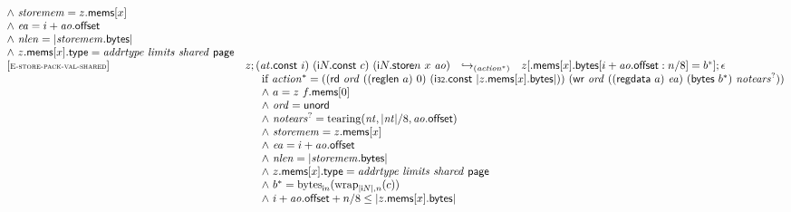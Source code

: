 $$\begin{array}[t]{@{}lrcl@{}l@{}}
{\begin{array}[t]{@{}l@{}}
{\land}~ {\mathit{storemem}} = z{.}\mathsf{mems}{}[x] \\
{\land}~ {\mathit{ea}} = i + {\mathit{ao}}{.}\mathsf{offset} \\
{\land}~ {\mathit{nlen}} = {|{\mathit{storemem}}{.}\mathsf{bytes}|} \\
{\land}~ z{.}\mathsf{mems}{}[x]{.}\mathsf{type} = {\mathit{addrtype}}~{\mathit{limits}}~{\mathit{shared}}~\mathsf{page} \\
\end{array}
} \\
{[\textsc{\scriptsize E{-}store{-}pack{-}val{-}shared}]} \quad & z ; ({\mathit{at}}{.}\mathsf{const}~i)~({\mathsf{i}}{N}{.}\mathsf{const}~c)~({{\mathsf{i}}{N}{.}\mathsf{store}}{n}~x~{\mathit{ao}}) & {\hookrightarrow}_{({{\mathit{action}}^\ast})} {} & z{}[{.}\mathsf{mems}{}[x]{.}\mathsf{bytes}{}[i + {\mathit{ao}}{.}\mathsf{offset} : n / 8] = {b^\ast}] ; \epsilon &  \\
& \multicolumn{4}{@{}l@{}}{\quad
\quad
\begin{array}[t]{@{}l@{}}
\mbox{if}~ {{\mathit{action}}^\ast} = ((\mathsf{rd}~{\mathit{ord}}~((\mathsf{reglen}~a)~0)~(\mathsf{i{\scriptstyle 32}}{.}\mathsf{const}~{|z{.}\mathsf{mems}{}[x]{.}\mathsf{bytes}|}))~(\mathsf{wr}~{\mathit{ord}}~((\mathsf{regdata}~a)~{\mathit{ea}})~(\mathsf{bytes}~{b^\ast})~{{\mathit{notears}}^?})) \\
{\land}~ a = z~f{.}\mathsf{mems}{}[0] \\
{\land}~ {\mathit{ord}} = \mathsf{unord} \\
{\land}~ {{\mathit{notears}}^?} = {\mathrm{tearing}}({\mathit{nt}}, {|{\mathit{nt}}|} / 8, {\mathit{ao}}{.}\mathsf{offset}) \\
{\land}~ {\mathit{storemem}} = z{.}\mathsf{mems}{}[x] \\
{\land}~ {\mathit{ea}} = i + {\mathit{ao}}{.}\mathsf{offset} \\
{\land}~ {\mathit{nlen}} = {|{\mathit{storemem}}{.}\mathsf{bytes}|} \\
{\land}~ z{.}\mathsf{mems}{}[x]{.}\mathsf{type} = {\mathit{addrtype}}~{\mathit{limits}}~{\mathit{shared}}~\mathsf{page} \\
{\land}~ {b^\ast} = {{\mathrm{bytes}}}_{{\mathsf{i}}{n}}({{\mathrm{wrap}}}_{{|{\mathsf{i}}{N}|}, n}(c)) \\
{\land}~ i + {\mathit{ao}}{.}\mathsf{offset} + n / 8 \leq {|z{.}\mathsf{mems}{}[x]{.}\mathsf{bytes}|} \\
\end{array}
} \\

\end{array}$$
